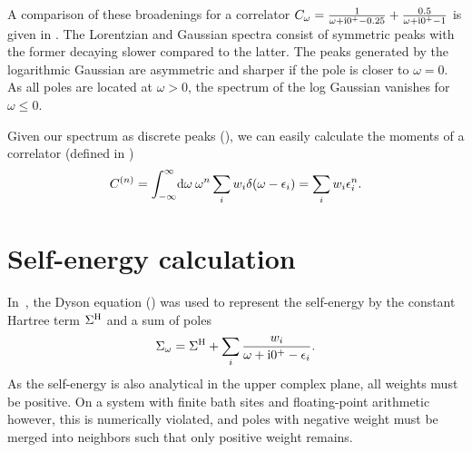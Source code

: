 A comparison of these broadenings for a correlator
$C_\omega = \frac{1}{\omega + \mathrm{i}0^+ - 0.25} + \frac{0.5}{\omega + \mathrm{i}0^+ - 1}$
is given in .
The Lorentzian and Gaussian spectra consist of symmetric peaks
with the former decaying slower compared to the latter.
The peaks generated by the logarithmic Gaussian are asymmetric
and sharper if the pole is closer to $\omega=0$.
As all poles are located at $\omega>0$,
the spectrum of the log Gaussian vanishes for $\omega\le0$.

Given our spectrum as discrete peaks (),
we can easily calculate the moments of a correlator (defined in )
\begin{equation}
    C^{(n)}
    =
    \int_{-\infty}^\infty\! \mathrm{d}\omega\> \omega^n \sum_i w_i \delta(\omega - \epsilon_i)
    =
    \sum_i w_i \epsilon_i^n.
\end{equation}

\section{Self-energy calculation}

In~\cite{Lu2014},
the Dyson equation () was used to represent the
self-energy by the constant Hartree term $\Sigma^{\mathrm{H}}$
and a sum of poles
\begin{equation}
    \Sigma_\omega = \Sigma^{\mathrm{H}} + \sum_i \frac{w_i}{\omega + \mathrm{i}0^+ - \epsilon_i}.
    \label{eq:self-energy-discrete}
\end{equation}
As the self-energy is also analytical in the upper complex plane,
all weights must be positive.
On a system with finite bath sites and floating-point arithmetic however,
this is numerically violated,
and poles with negative weight must be merged into neighbors
such that only positive weight remains.

